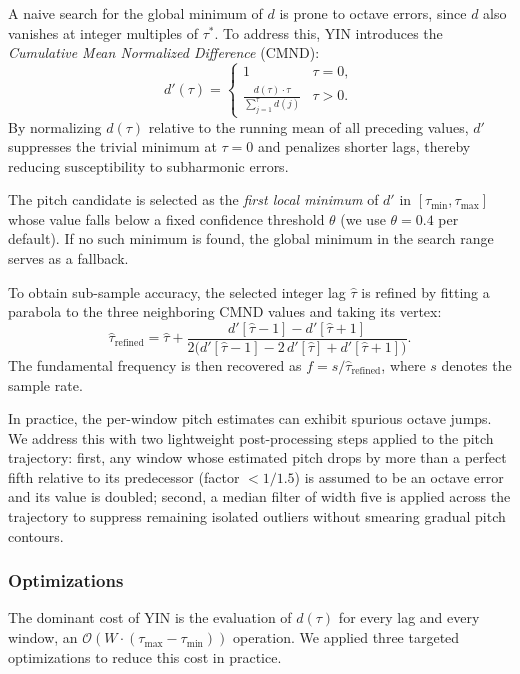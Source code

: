 \documentclass[sigconf]{acmart}
\begin{document}
    A naive search for the global minimum of $d$ is prone to octave errors, since $d$ also vanishes at integer multiples of $\tau^*$. To address this, YIN introduces the \emph{Cumulative Mean Normalized Difference} (CMND):
    $$
    d'(\tau) = \begin{cases}
                   1 & \tau = 0, \\ \displaystyle\frac{d(\tau) \cdot \tau}{\sum_{j=1}^{\tau} d(j)} & \tau > 0.
    \end{cases}
    $$
    By normalizing $d(\tau)$ relative to the running mean of all preceding values, $d'$ suppresses the trivial minimum at $\tau = 0$ and penalizes shorter lags, thereby reducing susceptibility to subharmonic errors.

    The pitch candidate is selected as the \emph{first local minimum} of $d'$ in $[\tau_{\min}, \tau_{\max}]$ whose value falls below a fixed confidence threshold $\theta$ (we use $\theta = 0.4$ per default). If no such minimum is found, the global minimum in the search range serves as a fallback.

    To obtain sub-sample accuracy, the selected integer lag $\hat\tau$ is refined by fitting a parabola to the three neighboring CMND values and taking its vertex:
    $$
    \hat\tau_{\text{refined}} = \hat\tau + \frac{d'[\hat\tau - 1] - d'[\hat\tau + 1]}{2\bigl(d'[\hat\tau - 1] - 2\,d'[\hat\tau] + d'[\hat\tau + 1]\bigr)}.
    $$
    The fundamental frequency is then recovered as $f = s / \hat\tau_{\text{refined}}$, where $s$ denotes the sample rate.

    In practice, the per-window pitch estimates can exhibit spurious octave jumps.
    We address this with two lightweight post-processing steps applied to the pitch trajectory: first, any window whose estimated pitch drops by more than a perfect fifth relative to its predecessor (factor $< 1/1.5$) is assumed to be an octave error and its value is doubled; second, a median filter of width five is applied across the trajectory to suppress remaining isolated outliers without smearing gradual pitch contours.

    \subsubsection{Optimizations}
    The dominant cost of YIN is the evaluation of $d(\tau)$ for every lag and every window, an $\mathcal{O}(W \cdot (\tau_{\max}-\tau_{\min}))$ operation. We applied three targeted optimizations to reduce this cost in practice.
\end{document}
